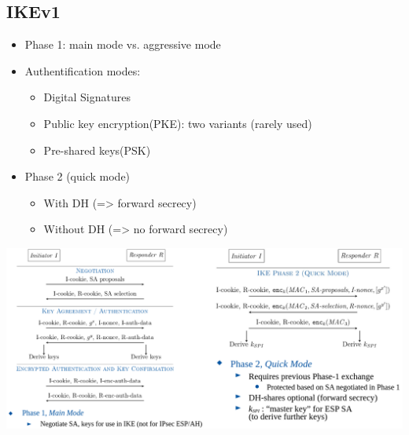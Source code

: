 \subsection{IKEv1}
\begin{itemize}
  \item Phase 1: main mode vs. aggressive mode
  \item Authentification modes:
    \begin{itemize}
      \item Digital Signatures
      \item Public key encryption(PKE): two variants (rarely used)
      \item Pre-shared keys(PSK)
    \end{itemize}
  \item Phase 2 (quick mode)
    \begin{itemize}
      \item With DH (=> forward secrecy)
      \item Without DH (=> no forward secrecy)
    \end{itemize}
\end{itemize}
\includegraphics[width=\columnwidth]{Resources/ikev1.png}

